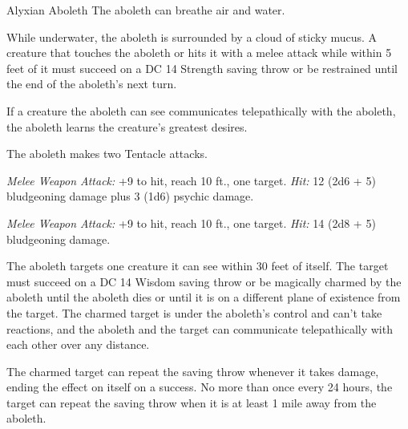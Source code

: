 \documentclass[10pt,a4paper,twoside,twocolumn,openany,nodeprecatedcode]{dndbook}
\begin{document}
\begin{DndMonster}[float=ht]{Alyxian Aboleth}
\DndMonsterBasics[
armor-class = {17 (natural armor)},
hit-points = {\DndDice{18d10 + 36}},
speed = {10 ft., 30 ft. (key)}
]
\DndMonsterAbilityScores[
 str = 21,
 dex = 9,
 con = 15,
 int = 18,
 wis = 18,
 cha = 18
]
\DndMonsterDetails[
saving-throws = {Con +6, Int +8, Wis +8},
skills = {History +12, Perception +12},
senses = {darkvision 120 ft., passive perception 22},
languages = {Deep Speech, telepathy 120 ft.},
challenge = 12,
]
The aboleth can breathe air and water.

While underwater, the aboleth is surrounded by a cloud of sticky mucus. A creature that touches the aboleth or hits it with a melee attack while within 5 feet of it must succeed on a DC 14 Strength saving throw or be restrained until the end of the aboleth's next turn.

If a creature the aboleth can see communicates telepathically with the aboleth, the aboleth learns the creature's greatest desires.

\par
{}
The aboleth makes two Tentacle attacks.

\textsl{Melee Weapon Attack:} +9 to hit, reach 10 ft., one target. \textsl{Hit:} 12 (2d6 + 5) bludgeoning damage plus 3 (1d6) psychic damage.

\textsl{Melee Weapon Attack:} +9 to hit, reach 10 ft., one target. \textsl{Hit:} 14 (2d8 + 5) bludgeoning damage.

\par
{}
The aboleth targets one creature it can see within 30 feet of itself. The target must succeed on a DC 14 Wisdom saving throw or be magically charmed by the aboleth until the aboleth dies or until it is on a different plane of existence from the target. The charmed target is under the aboleth's control and can't take reactions, and the aboleth and the target can communicate telepathically with each other over any distance.

The charmed target can repeat the saving throw whenever it takes damage, ending the effect on itself on a success. No more than once every 24 hours, the target can repeat the saving throw when it is at least 1 mile away from the aboleth.


\end{DndMonster}
\end{document}
